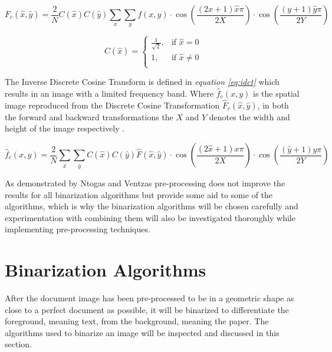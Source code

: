 \documentclass[11pt]{article}
\begin{document}
			\begin{large}
			\begin{equation} \label{eq:dct}
				F_c(\hat{x},\hat{y}) = \frac{2}{N} C(\hat{x})C(\hat{y})\sum_{x}\sum_{y}f(x, y) \cdot \cos(\frac{(2x + 1)\hat{x}\pi}{2X}) \cdot \cos(\frac{(y + 1) \hat{y} \pi}{2Y})
			\end{equation}
			\end{large}

			\begin{Large}
			\begin{equation} \label{eq:gainC}
			 C(\hat{x}) =
			 \begin{cases}
				\frac{1}{\sqrt{2}},          & \text{if } \hat{x} = 0     \\
				1, & \text{if } \hat{x} \neq 0 \\
			 \end{cases}
			\end{equation}
			\end{Large}

			The Inverse Discrete Cosine Transform is defined in \textit{equation \ref{eq:idct}} which results in an image with a limited frequency band. Where $\hat{f}_c(x,y)$ is the spatial image reproduced from the Discrete Cosine Transformation $\hat{F}_c(\hat{x}, \hat{y})$, in both the forward and backward transformations the $X$ and $Y$ denotes the width and height of the image respectively \cite{arnia2014improvement}.

			\begin{large}
			\begin{equation} \label{eq:idct}
				\hat{f}_c(x,y) = \frac{2}{N} \sum_{\hat{x}}\sum_{\hat{y}} C(\hat{x})C(\hat{y})\hat{F}(\hat{x}, \hat{y}) \cdot \cos(\frac{(2\hat{x} + 1)x\pi}{2X}) \cdot \cos(\frac{(\hat{y} + 1) y \pi}{2Y})
			\end{equation}
			\end{large}

			\newpage

			As demonstrated by Ntogas and Ventzas \cite{ntogas2008binarization} pre-processing does not improve the results for all binarization algorithms but provide some aid to some of the algorithms, which is why the binarization algorithms will be chosen carefully and experimentation with combining them will also be investigated thoroughly while implementing pre-processing techniques.

    \section{Binarization Algorithms}%
			After the document image has been pre-processed to be in a geometric shape as close to a perfect document as possible, it will be binarized to differentiate the foreground, meaning text, from the background, meaning the paper. The algorithms used to binarize an image will be inspected and discussed in this section.\\
\end{document}
